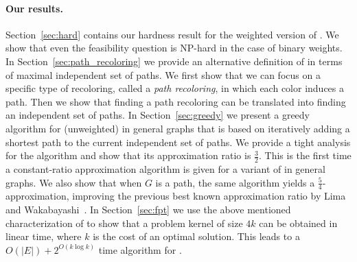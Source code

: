 \paragraph{Our results.}
%
Section~\ref{sec:hard} contains our hardness result for the weighted
version of \TWOCR{}.  We show that even the \TWOCR{} feasibility question is 
NP-hard in the case of binary weights.
%
In Section~\ref{sec:path_recoloring} we provide
an alternative definition of \TWOCR{} in terms of maximal independent
set of paths.
%
We first show that we can focus on a specific type of recoloring,
called a \emph{path recoloring},
in which each color induces a path.
%
Then we show that finding a path recoloring can be translated 
into finding an independent set of paths.
%
In Section~\ref{sec:greedy} we present a greedy algorithm for
(unweighted) \TWOCR{} in general graphs that is based on iteratively
adding a shortest path to the current independent set of paths.
%
We provide a tight analysis for the algorithm and show
that its approximation ratio is $\frac{3}{2}$.
%
This is the first time a constant-ratio approximation algorithm is
given for a variant of
\CRP{} in general graphs.
%
We also show that when $G$ is a path, 
the same algorithm yields a $\frac{5}{4}$-approximation, 
improving the previous best known approximation ratio by 
Lima and Wakabayashi~\cite{lima2014convex}.
%
In Section~\ref{sec:fpt} we use the above mentioned characterization
of \TWOCR{} to show that a problem kernel of size $4k$ can be obtained
in linear time, 
where $k$ is the cost of an optimal solution.
%
This leads to a $O(|E|) + 2^{O(k \log k)}$ time algorithm for \TWOCR{}. 
